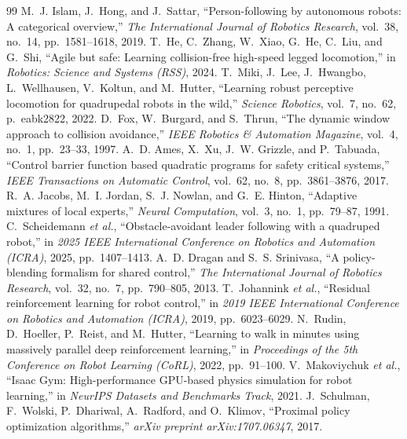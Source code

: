 \begin{thebibliography}{99}
\setlength{\itemsep}{-1.2pt}
 M.~J. Islam, J.~Hong, and J.~Sattar,
``Person-following by autonomous robots: A categorical overview,'' \emph{The
International Journal of Robotics Research}, vol.~38, no.~14, pp.~1581--1618,
2019.
 
 T.~He, C.~Zhang, W.~Xiao, G.~He, C.~Liu, and G.~Shi,
``Agile but safe: Learning collision-free high-speed legged locomotion,'' in
\emph{Robotics: Science and Systems (RSS)}, 2024.
 T.~Miki, J.~Lee, J.~Hwangbo, L.~Wellhausen, V.~Koltun,
and M.~Hutter, ``Learning robust perceptive locomotion for quadrupedal
robots in the wild,'' \emph{Science Robotics}, vol.~7, no.~62, p.~eabk2822,
2022.
 D.~Fox, W.~Burgard, and S.~Thrun, ``The dynamic window
approach to collision avoidance,'' \emph{IEEE Robotics \& Automation
Magazine}, vol.~4, no.~1, pp.~23--33, 1997.
 A.~D. Ames, X.~Xu, J.~W. Grizzle, and P.~Tabuada,
``Control barrier function based quadratic programs for safety critical
systems,'' \emph{IEEE Transactions on Automatic Control}, vol.~62, no.~8,
pp.~3861--3876, 2017.
 
 R.~A. Jacobs, M.~I. Jordan, S.~J. Nowlan, and
G.~E. Hinton, ``Adaptive mixtures of local experts,'' \emph{Neural
Computation}, vol.~3, no.~1, pp.~79--87, 1991.
 
 C.~Scheidemann \emph{et al.},
``Obstacle-avoidant leader following with a quadruped robot,'' in
\emph{2025 IEEE International Conference on Robotics and Automation (ICRA)},
2025, pp.~1407--1413.
 A.~D. Dragan and S.~S. Srinivasa, ``A
policy-blending formalism for shared control,'' \emph{The International
Journal of Robotics Research}, vol.~32, no.~7, pp.~790--805, 2013.
 T.~Johannink \emph{et al.}, ``Residual reinforcement
learning for robot control,'' in \emph{2019 IEEE International Conference on
Robotics and Automation (ICRA)}, 2019, pp.~6023--6029.
 N.~Rudin, D.~Hoeller, P.~Reist, and M.~Hutter,
``Learning to walk in minutes using massively parallel deep reinforcement
learning,'' in \emph{Proceedings of the 5th Conference on Robot Learning
(CoRL)}, 2022, pp.~91--100.
 V.~Makoviychuk \emph{et al.}, ``Isaac Gym:
High-performance GPU-based physics simulation for robot learning,'' in
\emph{NeurIPS Datasets and Benchmarks Track}, 2021.
 J.~Schulman, F.~Wolski, P.~Dhariwal, A.~Radford, and
O.~Klimov, ``Proximal policy optimization algorithms,'' \emph{arXiv
preprint arXiv:1707.06347}, 2017.
\end{thebibliography}
